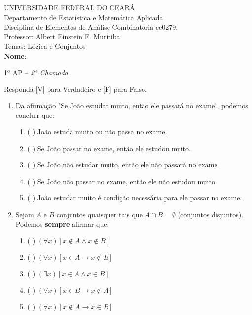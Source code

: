 \documentclass[a4paper,12pt]{letter}  %
\begin{document}
\thispagestyle{empty}

UNIVERSIDADE FEDERAL DO CEARÁ\\
Departamento de Estatística e Matemática Aplicada\\
Disciplina de Elementos de Análise Combinatória cc0279.\\
Professor: Albert Einstein F. Muritiba.\\
Temas: Lógica e Conjuntos\\[0.2cm]
\textbf{Nome}: \makebox[380pt]{\hrulefill} \vspace{2pt}

\begin{center}
	1º AP -- \textit{2ª Chamada}
\end{center}

Responda [V] para Verdadeiro e [F] para Falso.
\begin{enumerate}
    \item Da afirmação "Se João estudar muito, então ele passará no exame", podemos concluir que:
    \begin{enumerate}
        \item ( ) João estuda muito ou não passa no exame.
        \item ( ) Se João passar no exame, então ele estudou muito.
        \item ( ) Se João não estudar muito, então ele não passará no exame.
        \item ( ) Se João não passar no exame, então ele não estudou muito.
        \item ( ) João estudar muito é condição necessária para ele passar no exame.
    \end{enumerate}

    \item Sejam $A$ e $B$ conjuntos quaisquer tais que $A \cap B = \emptyset$ (conjuntos disjuntos). Podemos \textbf{sempre} afirmar que:
    \begin{enumerate}
        \item ( ) $(\forall x)[x \notin A \land x \notin B]$
        \item ( ) $(\forall x)[x \in A \rightarrow x \notin B]$
        \item ( ) $(\exists x)[x \in A \land x \in B]$
        \item ( ) $(\forall x)[x \in B \rightarrow x \notin A]$
        \item ( ) $(\forall x)[x \notin A \rightarrow x \in B]$
    \end{enumerate}


\end{enumerate}
\end{document}
